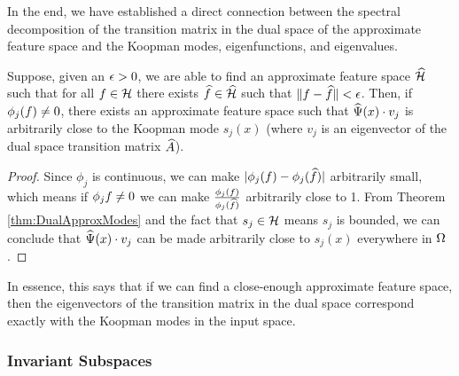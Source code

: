 In the end, we have established a direct connection between the spectral decomposition of the transition matrix in the dual space of the approximate feature space and the Koopman modes, eigenfunctions, and eigenvalues. 

\begin{corollary}\label{cor:ModesApprox}
	Suppose, given an $\epsilon>0$, we are able to find an approximate feature space $\widehat{\mathcal{H}}$ such that for all $f\in\mathcal{H}$ there exists $\widehat{f}\in\widehat{\mathcal{H}}$ such that $\|f - \widehat{f}\| < \epsilon$. Then, if $\phi_j(f) \neq 0$, there exists an approximate feature space such that $\widehat{\Psi}(x) \cdot v_j$ is arbitrarily close to the Koopman mode $s_j(x)$ (where $v_j$ is an eigenvector of the dual space transition matrix $\widehat{A}$).
\end{corollary}
\begin{proof}
	Since $\phi_j$ is continuous, we can make $|\phi_j(f) - \phi_j(\widehat{f})|$ arbitrarily small, which means if $\phi_j{f} \neq 0$ we can make $\frac{\phi_j(f)}{\phi_j(\widehat{f})}$ arbitrarily close to 1. From Theorem \ref{thm:DualApproxModes} and the fact that $s_j\in\mathcal{H}$ means $s_j$ is bounded, we can conclude that $\widehat{\Psi}(x) \cdot v_j$ can be made arbitrarily close to $s_j(x)$ everywhere in $\Omega$. %
	
\end{proof}

In essence, this says that if we can find a close-enough approximate feature space, then the eigenvectors of the transition matrix in the dual space correspond exactly with the Koopman modes in the input space.





\subsubsection{Invariant Subspaces}

